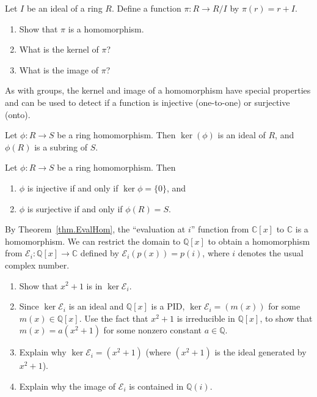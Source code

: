 \begin{problem}\label{prob.NaturalProjection}
Let $I$ be an ideal of a ring $R$. Define a function $\pi:R \rightarrow R/I$ by $\pi(r) = r+I$.
\begin{enumerate}
\item Show that $\pi$ is a homomorphism. %
\item What is the kernel of $\pi$?
\item What is the image of $\pi$?
\end{enumerate}
\end{problem}

As with groups, the kernel and image of a homomorphism have special properties and can be used to detect if a function is injective (one-to-one) or surjective (onto).

\begin{theorem}\label{thm.KernelIsIdealImageIsSubring}
Let $\phi:R\to S$ be a ring homomorphism. Then $\ker(\phi)$ is an ideal of $R$, and $\phi(R)$ is a subring of $S$.
\end{theorem}

\begin{theorem}\label{thm.HomInjectiveSurjective}
Let $\phi:R\to S$ be a ring homomorphism. Then
\begin{enumerate}
\item $\phi$ is injective if and only if $\ker \phi = \{0\}$, and 
\item $\phi$ is surjective if and only if $\phi(R) = S$.
\end{enumerate}
\end{theorem}

\begin{problem}\label{prob.EvalAtI}
By Theorem~\ref{thm.EvalHom}, the ``evaluation at $i$'' function from $\mathbb{C}[x]$ to  $\mathbb{C}$ is a homomorphism.  We can restrict the domain to $\mathbb{Q}[x]$ to obtain a homomorphism from $\mathcal{E}_{i}:\mathbb{Q}[x]\rightarrow\mathbb{C}$ defined by $\mathcal{E}_{i}(p(x)) = p(i)$, where $i$ denotes the usual complex number.
\begin{enumerate}
\item Show that $x^2+1$ is in $\ker \mathcal{E}_{i}$.
\item Since $\ker \mathcal{E}_{i}$ is an ideal and $\mathbb{Q}[x]$ is a PID, $\ker \mathcal{E}_{i} = (m(x))$ for some $m(x)\in \mathbb{Q}[x]$. Use the fact that $x^2+1$ is irreducible in $\mathbb{Q}[x]$, to show that $m(x) = a(x^2+1)$ for some nonzero constant $a\in \mathbb{Q}$.
\item Explain why $\ker \mathcal{E}_{i} = (x^2 + 1)$ (where $(x^2 + 1)$ is the ideal generated by $x^2 + 1$).
\item Explain why the image of $\mathcal{E}_{i}$ is contained in $\mathbb{Q}(i)$.
\end{enumerate}
\end{problem}

